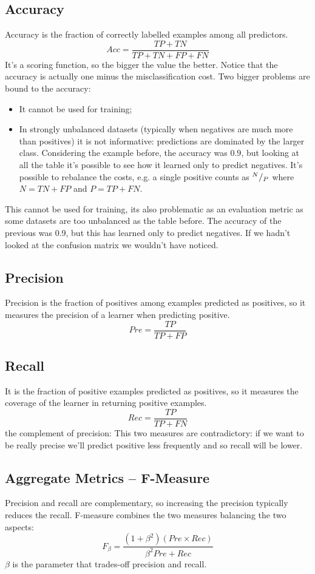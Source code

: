 \subsection{Accuracy}
Accuracy is the fraction of correctly labelled examples among all predictors. 
\[Acc=\frac{TP+TN}{TP+TN+FP+FN}\]
It's a scoring function, so the bigger the value the better. Notice that the accuracy is actually one minus the misclassification cost. \newline
Two bigger problems are bound to the accuracy:
\begin{itemize}
  \item It cannot be used for training;
  \item In strongly unbalanced datasets (typically when negatives are much more than positives) it is not informative: predictions are dominated by the larger class. Considering the example before, the accuracy was $0.9$, but looking at all the table it's possible to see how it learned only to predict negatives. It's possible to rebalance the costs, e.g. a single positive counts as ${}^{N}/_{P}$ where $N=TN+FP$ and $P=TP+FN$.
\end{itemize}
This cannot be used for training, its also problematic as an evaluation metric as some datasets are too unbalanced as the table before. The accuracy of the previous was 0.9, but this has learned only to predict negatives. If we hadn't looked at the confusion matrix we wouldn't have noticed. 
%
%
\subsection{Precision}
Precision is the fraction of positives among examples predicted as positives, so it measures the precision of a learner when predicting positive. 
\[Pre=\frac{TP}{TP+FP}\]
%
%
\subsection{Recall}
It is the fraction of positive examples predicted as positives, so it measures the coverage of the learner in returning positive examples.
\[Rec=\frac{TP}{TP+FN}\]
    the complement of precision:  This two measures are contradictory: if we want to be really precise we'll predict positive less frequently and so recall will be lower.
%
%
\subsection{Aggregate Metrics -- F-Measure}
Precision and recall are complementary, so increasing the precision typically reduces the recall. F-measure combines the two measures balancing the two aspects:
\[F_\beta=\frac{(1+\beta^2)(Pre\times Rec)}{\beta^2Pre+Rec}\]
$\beta$ is the parameter that trades-off precision and recall.
%
